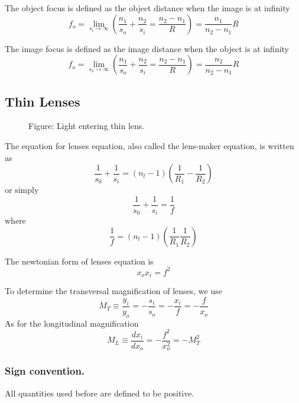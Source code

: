 \documentclass[../../../main.tex]{subfiles}
\begin{document}
The object focus is defined as the object distance when the image is at infinity
\begin{equation*}
    f_o=\lim_{s_i\rightarrow\infty}\left(\frac{n_1}{s_o}+\frac{n_2}{s_i}=\frac{n_2-n_1}{R}\right)=\frac{n_1}{n_2-n_1}R
\end{equation*}

The image focus is defined as the image distance when the object is at infinity
\begin{equation*}
    f_o=\lim_{s_o\rightarrow\infty}\left(\frac{n_1}{s_o}+\frac{n_2}{s_i}=\frac{n_2-n_1}{R}\right)=\frac{n_2}{n_2-n_1}R
\end{equation*}

\subsection{Thin Lenses}
\begin{figure}
    \centering
    \caption*{Figure: Light entering thin lens.}
\end{figure}
The equation for lenses equation, also called the lens-maker equation, is written as 
\begin{equation*}
    \frac{1}{s_0}+\frac{1}{s_i}=(n_l-1)\left(\frac{1}{R_1}-\frac{1}{R_2}\right)
\end{equation*}
or simply
\begin{equation*}
    \frac{1}{s_0}+\frac{1}{s_i}=\frac{1}{f}
\end{equation*}
where
\begin{equation*}
    \frac{1}{f}=(n_l-1)\left(\frac{1}{R_1}\frac{1}{R_2}\right)
\end{equation*}

The newtonian form of lenses equation is 
\begin{equation*}
    x_ox_i=f^2
\end{equation*}

To determine the transversal magnification of lenses, we use 
\begin{equation*}
    M_T\equiv \frac{y_i}{y_o}=-\frac{s_i}{s_o}=-\frac{x_i}{f}=-\frac{f}{x_o}
\end{equation*}
As for the longitudinal magnification
\begin{equation*}
    M_L\equiv \frac{dx_i}{dx_o}=-\frac{f^2}{x_o^2}=-M_T^2
\end{equation*}

\subsubsection{Sign convention.} All quantities used before are defined to be positive.
\end{document}
